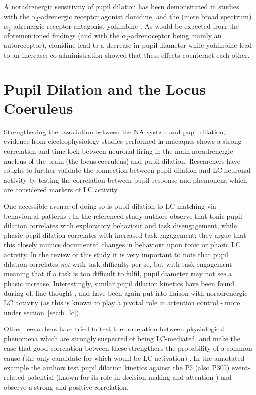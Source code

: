 	A noradrenergic sensitivity of pupil dilation has been demonstrated in studies with the $\alpha_2$-adrenergic receptor agonist clonidine, and the (more broad spectrum) $\alpha_2$-adrenergic receptor antagonist yohimbine \citep{Phillips2000}. 
	As would be expected from the aforementioned findings (and with the $\alpha_2$-adrenoceptor being mainly an autoreceptor), clonidine lead to a decrease in pupil diameter while yohimbine lead to an increase; co-administration showed that these effects counteract each other.
	
    \section{Pupil Dilation and the Locus Coeruleus}
	Strengthening the association between the NA system and pupil dilation, evidence from electrophysiology studies performed in macaques \citep{Rajkowski1994} shows a strong correlation and time-lock between neuronal firing in the main noradrenergic nucleus of the brain (the locus coeruleus) and pupil dilation.
	Researchers have sought to further validate the connection between pupil dilation and LC neuronal activity by testing the correlation between pupil response and phemonena which are considered markers of LC activity.
	
	One accessible avenue of doing so is pupil-dilation to LC matching via behavioural patterns \citep{Gilzenrat2010}.
	In the referenced study authors observe that tonic pupil dilation correlates with exploratory behaviour and task disengagement, while phasic pupil dilation correlates with increased task engagement; they argue that this closely mimics documented \citep{Aston-Jones2005} changes in behaviour upon tonic or phasic LC activity.
	In the review of this study it is very important to note that pupil dilation correlates \textit{not} with task difficulty per se, but with task engagement - meaning that if a task is too difficult to fulfil, pupil diameter may not see a phasic increase.
	Interestingly, similar pupil dilation kinetics have been found during off-line thought \citep{Smallwood2011}, and have been again put into liaison with noradrenergic LC activity (as this is known to play a pivotal role in attention control - more under section~\ref{sec:b_lc}).   
	
	Other researchers have tried to test the correlation between physiological phenomena which are strongly suspected of being LC-mediated, and make the case that good correlation between these strengthens the probability of a common cause (the only candidate for which would be LC activation) \citep{Murphy2011}.
	In the annotated example the authors test pupil dilation kinetics against the P3 (also P300) event-related potential (known for its role in decision-making \citep{CHAPMAN1964} and attention \citep{Picton1992}) and observe a strong and positive correlation.
	
